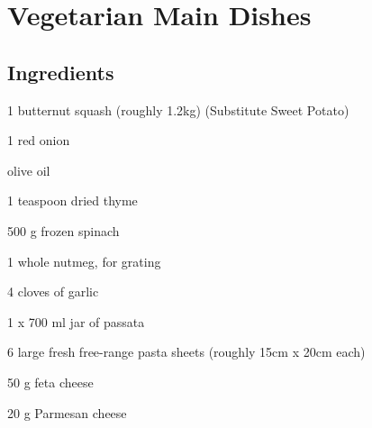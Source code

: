 \chapter{Vegetarian Main Dishes}
\section*{Ingredients}
\begin{ingredients-list}
	\item 1 butternut squash (roughly 1.2kg) (Substitute Sweet Potato)
	\item 1 red onion
	\item olive oil
	\item 1 teaspoon dried thyme
	\item 500 g frozen spinach
	\item 1 whole nutmeg, for grating
	\item 4 cloves of garlic
	\item 1 x 700 ml jar of passata
	\item 6 large fresh free-range pasta sheets (roughly 15cm x 20cm each)
	\item 50 g feta cheese
	\item20 g Parmesan cheese
\end{ingredients-list}

